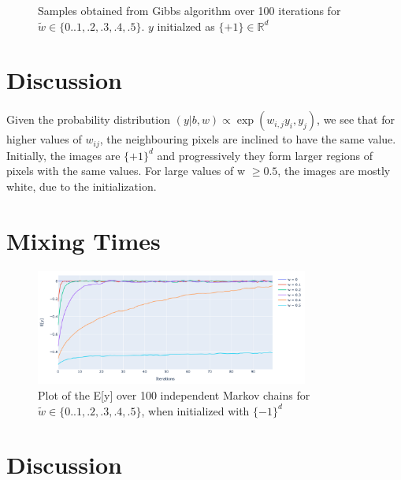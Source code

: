 \documentclass[11pt]{article}
\begin{document}
\begin{figure}[H]
    \qquad
    \caption{Samples obtained from Gibbs algorithm over 100 iterations for $\tilde{w} \in \{0. .1, .2, .3, .4, .5\}$. $y$ initialzed as $\{+1\} \in \mathbb{R}^d$}%
\end{figure}

\section{Discussion}

Given the probability distribution $(y | b, w) \propto \exp(w_{i,j} y_i, y_j)$, we see that for higher values of $w_{ij}$, the neighbouring pixels are inclined to have the same value. Initially, the images are $\{+1\}^d$ and progressively they form larger regions of pixels with the same values. For large values of w $\ge 0.5$, the images are mostly white, due to the initialization.

\section{Mixing Times}

\begin{figure}[H]%
    \centering
    \includegraphics[width=0.8\textwidth]{./images/normalized-labeled.png}
    \caption{Plot of the E[y] over 100 independent Markov chains for $\tilde{w} \in \{0. .1, .2, .3, .4, .5\}$, when initialized with $\{-1\}^d$}
\end{figure}

\section{Discussion}
\end{document}
